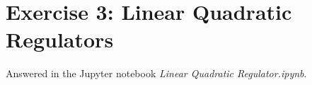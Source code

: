 \section*{Exercise 3: Linear Quadratic Regulators}
Answered in the Jupyter notebook \textit{Linear Quadratic Regulator.ipynb}.
